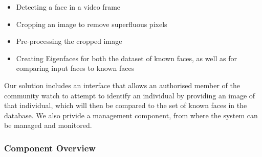\documentclass[a4paper]{article}
\begin{document}
				\begin{itemize}
				
					\item Detecting a face in a video frame
					
					\item Cropping an image to remove superfluous pixels
					
					\item Pre-processing the cropped image
					
					\item Creating Eigenfaces for both the dataset of known faces, as well as for comparing input faces to known faces
				
				\end{itemize}
			Our solution includes an interface that allows an authorised member of the community watch to attempt to identify an individual by providing 
			an image of that individual, which will then be compared to the set of known faces in the database. We also privide a management component,
			from where the system can be managed and monitored.
			
			\subsubsection{Component Overview}
			
\end{document}

